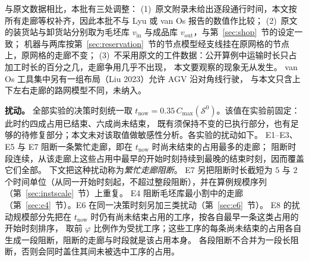 \documentclass[manuscript,screen,review]{acmart}
\begin{document}
与原文数据相比，本批有三处调整：
(1)~原文附录未给出逐段通行时间，本文按所有走廊等权补齐，因此本批不与 Lyu 或 van Os 报告的数值作比较；
(2)~原文的装货站与卸货站分别取为毛坯库 \(v_{\mathrm{in}}\) 与成品库 \(v_{\mathrm{out}}\)，与第~\ref{sec:shop}~节的设定一致；
机器与两库按第~\ref{sec:reservation}~节的节点模型经支线挂在原网格的节点上，原网格的走廊不变；
(3)~不采用原文的工件数据：公开算例中运输时长只占加工时长的百分之几，走廊争用几乎不出现，
本文要观察的现象无从发生。
van Os 工具集中另有一组布局（Liu 2023）允许 AGV 沿对角线行驶，
与本文只含上下左右走廊的路网模型不同，未纳入。

\textbf{扰动。}
全部实验的决策时刻统一取 \(t_{\mathrm{now}}=0.35\,C_{\max}(\mathcal{S}^0)\)。该值在实验前固定：此时约四成占用已结束、六成尚未结束，
既有须保持不变的已执行部分，也有足够的待修复部分；本文未对该取值做敏感性分析。各实验的扰动如下。
E1--E3、E5 与 E7 阻断一条繁忙走廊，即在 \(t_{\mathrm{now}}\) 时尚未结束的占用最多的走廊；
阻断时段连续，从该走廊上这些占用中最早的开始时刻持续到最晚的结束时刻，因而覆盖它们全部。
下文把这种扰动称为\emph{繁忙走廊阻断}。
E7 另把阻断时长截短为 \(5\) 与 \(2\) 个时间单位（从同一开始时刻起，不超过整段阻断），并在算例规模序列（第~\ref{sec:instscale}~节）上重复。
E4 阻断毛坯库最小割中的走廊（第~\ref{sec:e4}~节）。E6 在同一决策时刻另加三类扰动（第~\ref{sec:e6}~节）。
E8 的扰动规模部分先把在 \(t_{\mathrm{now}}\) 时仍有尚未结束占用的工序，按各自最早一条这类占用的开始时刻排序，
取前 \(\varphi\) 比例作为受扰工序；这些工序的每条尚未结束的占用各自生成一段阻断，阻断的走廊与时段就是该占用本身。
各段阻断不合并为一段长阻断，否则会同时盖住其间未被选中工序的占用。
\end{document}
